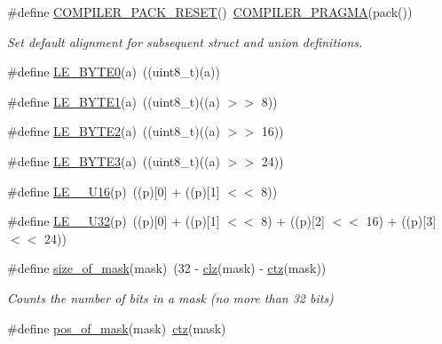 \begin{DoxyCompactItemize}
\#define \hyperlink{group__doc__driver__hal__utils__macro_ga38d28b622a4bc7b0f3fb2be2ef1e0086}{C\+O\+M\+P\+I\+L\+E\+R\+\_\+\+P\+A\+C\+K\+\_\+\+R\+E\+S\+ET}()~\hyperlink{group__doc__driver__hal__utils__macro_ga85a3ab5701281268521f109ed0078668}{C\+O\+M\+P\+I\+L\+E\+R\+\_\+\+P\+R\+A\+G\+MA}(pack())
\begin{DoxyCompactList}\small\item\em Set default alignment for subsequent struct and union definitions. \end{DoxyCompactList}\item 
\#define \hyperlink{group__doc__driver__hal__utils__macro_gaab4d1853098bbbfe4567d6cd7f2c099a}{L\+E\+\_\+\+B\+Y\+T\+E0}(a)~((uint8\+\_\+t)(a))
\item 
\#define \hyperlink{group__doc__driver__hal__utils__macro_ga2c2cccafec8ecf0d26a8bdcf8f7748d3}{L\+E\+\_\+\+B\+Y\+T\+E1}(a)~((uint8\+\_\+t)((a) $>$$>$ 8))
\item 
\#define \hyperlink{group__doc__driver__hal__utils__macro_gac21be76d243d97c095fe4ec85c94968c}{L\+E\+\_\+\+B\+Y\+T\+E2}(a)~((uint8\+\_\+t)((a) $>$$>$ 16))
\item 
\#define \hyperlink{group__doc__driver__hal__utils__macro_ga3ef5f564d5325745d309b92ca5be0462}{L\+E\+\_\+\+B\+Y\+T\+E3}(a)~((uint8\+\_\+t)((a) $>$$>$ 24))
\item 
\#define \hyperlink{group__doc__driver__hal__utils__macro_ga28c4c688462eddbe0385bdece51c5f33}{L\+E\+\_\+\_\+\+U16}(p)~((p)\mbox{[}0\mbox{]} + ((p)\mbox{[}1\mbox{]} $<$$<$ 8))
\item 
\#define \hyperlink{group__doc__driver__hal__utils__macro_gac21ac7b0f38e7b8138886c362d9cc663}{L\+E\+\_\+\_\+\+U32}(p)~((p)\mbox{[}0\mbox{]} + ((p)\mbox{[}1\mbox{]} $<$$<$ 8) + ((p)\mbox{[}2\mbox{]} $<$$<$ 16) + ((p)\mbox{[}3\mbox{]} $<$$<$ 24))
\item 
\#define \hyperlink{group__doc__driver__hal__utils__macro_gacb24f277663a5c87482fbcdbef5f2bd2}{size\+\_\+of\+\_\+mask}(mask)~(32 -\/ \hyperlink{group__doc__driver__hal__utils__macro_ga004f88903a09b9c23017e697eaf5a845}{clz}(mask) -\/ \hyperlink{group__doc__driver__hal__utils__macro_gab069bfec305db5213465d3b689836404}{ctz}(mask))
\begin{DoxyCompactList}\small\item\em Counts the number of bits in a mask (no more than 32 bits) \end{DoxyCompactList}\item 
\#define \hyperlink{group__doc__driver__hal__utils__macro_ga6e6ec9c159cae4680d073d707063fa0e}{pos\+\_\+of\+\_\+mask}(mask)~\hyperlink{group__doc__driver__hal__utils__macro_gab069bfec305db5213465d3b689836404}{ctz}(mask)
$$
\end{DoxyCompactItemize}
